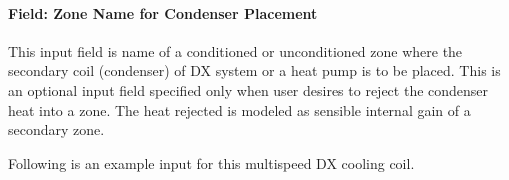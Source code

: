 \paragraph{Field: Zone Name for Condenser Placement}\label{field-zone-name-for-condenser-placement-2}

This input field is name of a conditioned or unconditioned zone where the secondary coil (condenser) of DX system or a heat pump is to be placed. This is an optional input field specified only when user desires to reject the condenser heat into a zone. The heat rejected is modeled as sensible internal gain of a secondary zone.

Following is an example input for this multispeed DX cooling coil.

\begin{lstlisting}


\end{lstlisting}
